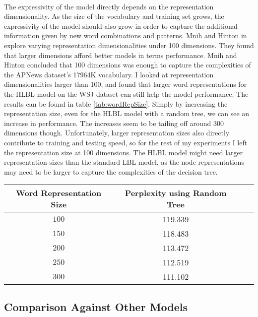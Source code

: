 \documentclass[12pt]{ociamthesis}  %
\newcommand{\ra}[1]{\renewcommand{\arraystretch}{#1}}
\begin{document}
\paragraph{}
The expressivity of the model directly depends on the representation dimensionality. As the size of the vocabulary and training set grows, the expressivity of the model should also grow in order to capture the additional information given by new word combinations and patterns. Mnih and Hinton in \cite{MnihHinton2009} explore varying representation dimensionalities under 100 dimensions. They found that larger dimensions afford better models in terms performance. Mnih and Hinton concluded that 100 dimensions was enough to capture the complexities of the APNews dataset's 17964K vocabulary. I looked at representation dimensionalities larger than 100, and found that larger word representations for the HLBL model on the WSJ dataset can still help the model performance. The results can be found in table \ref{tab:wordRepSize}. Simply by increasing the representation size, even for the HLBL model with a random tree, we can see an increase in performance. The increases seem to be tailing off around 300 dimensions though. Unfortunately, larger representation sizes also directly contribute to training and testing speed, so for the rest of my experiments I left the representation size at 100 dimensions. The HLBL model might need larger representation sizes than the standard LBL model, as the node representations may need to be larger to capture the complexities of the decision tree.


\begin{table*} \centering
\ra{1.3}
\begin{tabular}{@{}cccc@{}}\toprule
Word Representation Size & Perplexity using Random Tree\\ 
\midrule
$100$ & 119.339 \\
$150$ & 118.483 \\
$200$ & 113.472 \\
$250$ & 112.519 \\
$300$ & 111.102 \\
\bottomrule
\end{tabular}
\caption{The effect of word representation size on test perplexity.}
\label{tab:wordRepSize}
\end{table*}

\subsection{Comparison Against Other Models}
\end{document}
